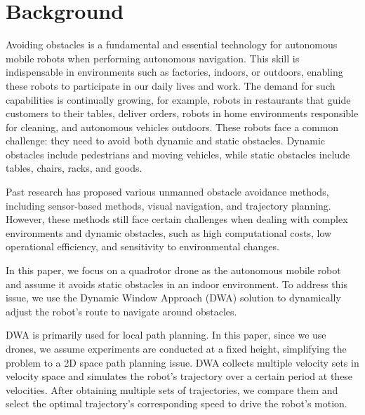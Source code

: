\documentclass[crop=false]{standalone}
\begin{document}
	\section{Background}
	Avoiding obstacles is a fundamental and essential technology for autonomous mobile robots when performing autonomous navigation. This skill is indispensable in environments such as factories, indoors, or outdoors, enabling these robots to participate in our daily lives and work. The demand for such capabilities is continually growing, for example, robots in restaurants that guide customers to their tables, deliver orders, robots in home environments responsible for cleaning, and autonomous vehicles outdoors. These robots face a common challenge: they need to avoid both dynamic and static obstacles. Dynamic obstacles include pedestrians and moving vehicles, while static obstacles include tables, chairs, racks, and goods.
	
	Past research has proposed various unmanned obstacle avoidance methods, including sensor-based methods, visual navigation, and trajectory planning. However, these methods still face certain challenges when dealing with complex environments and dynamic obstacles, such as high computational costs, low operational efficiency, and sensitivity to environmental changes.
	
	In this paper, we focus on a quadrotor drone as the autonomous mobile robot and assume it avoids static obstacles in an indoor environment. To address this issue, we use the Dynamic Window Approach (DWA) solution to dynamically adjust the robot's route to navigate around obstacles.
	
	DWA is primarily used for local path planning. In this paper, since we use drones, we assume experiments are conducted at a fixed height, simplifying the problem to a 2D space path planning issue. DWA collects multiple velocity sets in velocity space and simulates the robot's trajectory over a certain period at these velocities. After obtaining multiple sets of trajectories, we compare them and select the optimal trajectory's corresponding speed to drive the robot's motion.
\end{document}
